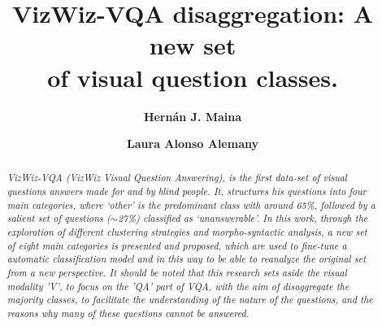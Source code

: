 \documentclass[runningheads, twocolumn]{llncs}
\begin{document}
\title{\textbf{VizWiz-VQA disaggregation: A new set\\ of visual question classes.}}
\author{
 \textbf{Hernán J. Maina} \and {} \textbf{Laura Alonso Alemany} }


\maketitle
\begin{abstract}

\emph{VizWiz-VQA (VizWiz Visual Question Answering), is the first data-set of visual questions answers made for and by blind people. It, structures his questions into four main categories, where `other' is the predominant class with around 65\%, followed by a salient set of questions ($\sim$27\%) classified as `unanswerable'. In this work, through the exploration of different clustering strategies and morpho-syntactic analysis, a new set of eight main categories is presented and proposed, which are used to fine-tune a automatic classification model and in this way to be able to reanalyze the original set from a new perspective. It should be noted that this research sets aside the visual modality 'V', to focus on the 'QA' part of VQA, with the aim of disaggregate the majority classes, to facilitate the understanding of the nature of the questions, and the reasons why many of these questions cannot be answered.}
\end{abstract}
\end{document}
